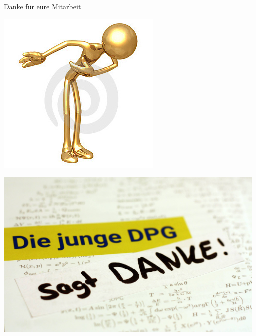 \documentclass[
]{beamer}
\begin{document}
\begin{frame}{Danke für eure Mitarbeit}
  \begin{minipage}[c]{0.35\textwidth}
    \includegraphics[]{figure/thank_you_1}
  \end{minipage}
  \hfill
  \begin{minipage}[c]{0.64\textwidth}
    \includegraphics[width=0.99\textwidth]{figure/20171206-Christina-Nolte-Merphi}
  \end{minipage}
\end{frame}
\end{document}

